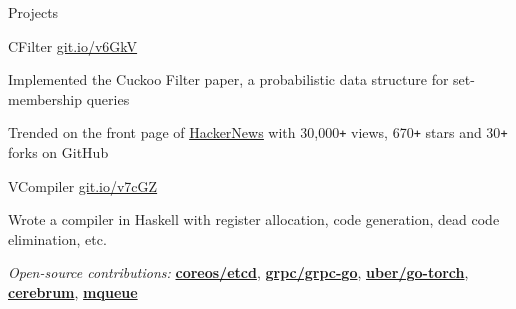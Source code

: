 \documentclass{resume} %
\begin{document}
\begin{rSection}{Projects}
  \begin{rSubsection}{CFilter}
    {\href{https://git.io/v6GkV}{git.io/v6GkV}}
                     {}{}
     \item Implemented the Cuckoo Filter paper, a probabilistic data structure for
       set-membership queries
     \item Trended on the front page of
       \href{https://news.ycombinator.com/item?id=12241332}{\underline
       {HackerNews}} with 30,000\texttt{+} views, 670\texttt{+} stars and
       30\texttt{+} forks on GitHub
  \end{rSubsection}

  \begin{rSubsection}{VCompiler}
    {\href{https://git.io/v7cGZ}{git.io/v7cGZ}}
                     {}{}
                   \item Wrote a compiler in Haskell with register allocation, code generation,
                     dead code elimination, etc.
  \end{rSubsection}

  \begin{rMinisection}
    \item {\em Open-source contributions:}
      \href{https://github.com/coreos/etcd/pull/8288}{\textbf{coreos/etcd}},
      \href{https://github.com/grpc/grpc-go/pull/1478}{\textbf{grpc/grpc-go}},
      \href{https://github.com/uber/go-torch/pull/62}{\textbf{uber/go-torch}},
      \href{https://rubygems.org/gems/cerebrum}{\textbf{cerebrum}},
      \href{https://rubygems.org/gems/mqueue}{\textbf{mqueue}}
  \end{rMinisection}
\end{rSection}
\end{document}
